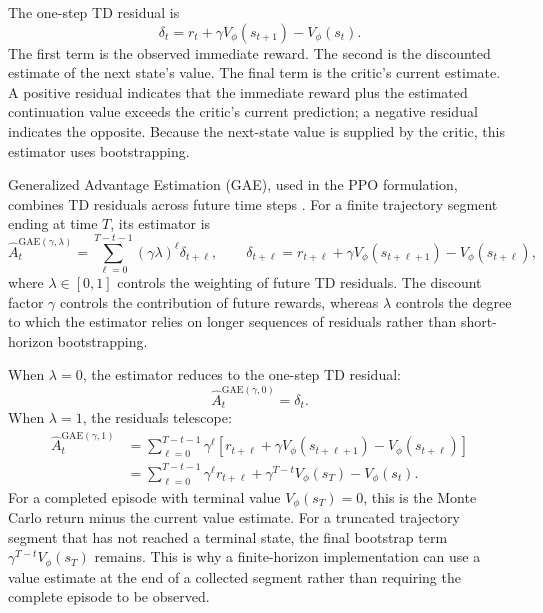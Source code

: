 The one-step TD residual is
\begin{equation}
    \delta_t
    =
    r_t+\gamma V_\phi(s_{t+1})-V_\phi(s_t).
    \label{eq:ac-td-residual}
\end{equation}
The first term is the observed immediate reward. The second is the
discounted estimate of the next state's value. The final term is the
critic's current estimate. A positive residual indicates that the
immediate reward plus the estimated continuation value exceeds the
critic's current prediction; a negative residual indicates the opposite.
Because the next-state value is supplied by the critic, this estimator
uses bootstrapping.

Generalized Advantage Estimation (GAE), used in the PPO formulation,
combines TD residuals across future time steps
\parencite{schulman2017ppo}. For a finite trajectory segment ending at
time \(T\), its estimator is
\begin{equation}
    \widehat{A}^{\mathrm{GAE}(\gamma,\lambda)}_t
    =
    \sum_{\ell=0}^{T-t-1}
    (\gamma\lambda)^\ell\delta_{t+\ell},
    \qquad
    \delta_{t+\ell}
    =
    r_{t+\ell}
    +\gamma V_\phi(s_{t+\ell+1})
    -V_\phi(s_{t+\ell}),
    \label{eq:ac-gae}
\end{equation}
where \(\lambda\in[0,1]\) controls the weighting of future TD residuals.
The discount factor \(\gamma\) controls the contribution of future rewards,
whereas \(\lambda\) controls the degree to which the estimator relies on
longer sequences of residuals rather than short-horizon bootstrapping.

When \(\lambda=0\), the estimator reduces to the one-step TD residual:
\begin{equation}
    \widehat{A}^{\mathrm{GAE}(\gamma,0)}_t
    =
    \delta_t.
    \label{eq:ac-gae-lambda-zero}
\end{equation}
When \(\lambda=1\), the residuals telescope:
\begin{align}
    \widehat{A}^{\mathrm{GAE}(\gamma,1)}_t
    &=
    \sum_{\ell=0}^{T-t-1}
    \gamma^\ell
    \left[
        r_{t+\ell}
        +\gamma V_\phi(s_{t+\ell+1})
        -V_\phi(s_{t+\ell})
    \right]
    \nonumber\\
    &=
    \sum_{\ell=0}^{T-t-1}\gamma^\ell r_{t+\ell}
    +\gamma^{T-t}V_\phi(s_T)-V_\phi(s_t).
    \label{eq:ac-gae-telescoping}
\end{align}
For a completed episode with terminal value \(V_\phi(s_T)=0\), this is
the Monte Carlo return minus the current value estimate. For a truncated
trajectory segment that has not reached a terminal state, the final
bootstrap term \(\gamma^{T-t}V_\phi(s_T)\) remains. This is why a
finite-horizon implementation can use a value estimate at the end of a
collected segment rather than requiring the complete episode to be
observed.

